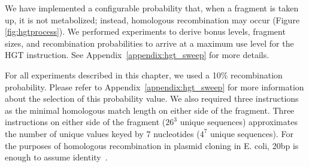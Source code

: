 \documentclass[PhD]{msu-thesis}
\begin{document}
We have implemented a configurable probability that, when a fragment is taken up, it is not metabolized;
instead, homologous recombination may occur (Figure \ref{fig:hgtprocess}). We performed experiments to derive bonus levels, fragment sizes, and recombination probabilities to arrive at a maximum use level for the HGT instruction. See Appendix~\ref{appendix:hgt_sweep} for more details. 

For all experiments described in this chapter, we used a 10\% recombination probability. Please refer to Appendix~\ref{appendix:hgt_sweep} for more information about the selection of this probability value. We also required three instructions as the minimal homologous match length on either side of the fragment. Three instructions on either side of the fragment ($26^3$ unique sequences) approximates the number of unique values keyed by 7 nucleotides ($4^7$ unique sequences). For the purposes of homologous recombination in plasmid cloning in E. coli, 20bp is enough to assume identity~\cite{jacobus_optimal_2015}.   

\end{document}
